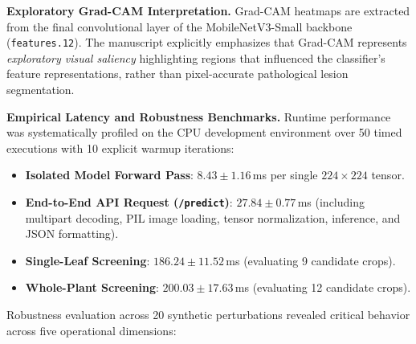 \documentclass[pdflatex,sn-mathphys-num]{sn-jnl}
\theoremstyle{thmstyleone}%
\theoremstyle{thmstyletwo}%
\theoremstyle{thmstylethree}%
\begin{document}
\textbf{Exploratory Grad-CAM Interpretation.}
Grad-CAM heatmaps are extracted from the final convolutional layer of the MobileNetV3-Small backbone (\texttt{features.12}). The manuscript explicitly emphasizes that Grad-CAM represents \textit{exploratory visual saliency} highlighting regions that influenced the classifier's feature representations, rather than pixel-accurate pathological lesion segmentation.

\textbf{Empirical Latency and Robustness Benchmarks.}
Runtime performance was systematically profiled on the CPU development environment over 50 timed executions with 10 explicit warmup iterations:
\begin{itemize}
  \item \textbf{Isolated Model Forward Pass}: $8.43 \pm 1.16$\,ms per single $224 \times 224$ tensor.
  \item \textbf{End-to-End API Request (\texttt{/predict})}: $27.84 \pm 0.77$\,ms (including multipart decoding, PIL image loading, tensor normalization, inference, and JSON formatting).
  \item \textbf{Single-Leaf Screening}: $186.24 \pm 11.52$\,ms (evaluating 9 candidate crops).
  \item \textbf{Whole-Plant Screening}: $200.03 \pm 17.63$\,ms (evaluating 12 candidate crops).
\end{itemize}
Robustness evaluation across 20 synthetic perturbations revealed critical behavior across five operational dimensions:
\end{document}
